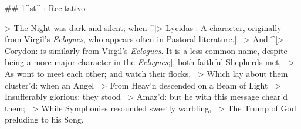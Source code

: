 ## 1^st^ \mvmt: Recitativo


> The Night was dark and silent; when ^[> Lycidas : A character, originally from Virgil's \textit{Eclogues}, who appears often in Pastoral literature.] \
> And ^[> Corydon: is similarly from Virgil's \textit{Eclogues}. It is a less common name, despite being a more major character in the \textit{Eclogues};], both faithful Shepherds met,  \
> As wont to meet each other; and watch their flocks,  \
> Which lay about them cluster’d: when an Angel  \
> From Heav’n descended on a Beam of Light  \
> Insufferably glorious: they stood  \
> Amaz’d: but he with this message chear’d them;  \
> While Symphonies resounded sweetly warbling,  \
> The Trump of God preluding to his Song.

